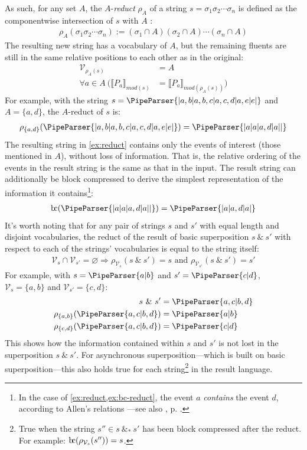 \documentclass[a4paper,12pt,leqno]{article}
\newcommand{\bc}{{\rm b\!c}}
\newcommand{\vph}[1]{\vphantom{#1}}
\newcommand{\ebox}[1]{\fbox{$\vph{'(),}#1$}}
\renewcommand{\sp}{~\&~}
\newcommand{\spasync}{~\&_*~}
\newcommand{\V}{\mathcal{V}}
\renewcommand{\emptyset}{\varnothing}
\newcommand{\EventString}[1]{%
	\renewcommand*{\do}[1]{\ebox{##1}}%
	\PipeParser{#1}%
}
\begin{document}
As such, for any set $A$, the $A$-\textit{reduct} $\rho_A$ of a string $s=\sigma_1\sigma_2\cdots\sigma_n$ is defined as the componentwise intersection of $s$ with $A$ \citep{fernando2016regular,woods2018improving}:
\begin{align}
	\rho_A(\sigma_1\sigma_2\cdots\sigma_n) := (\sigma_1 \cap A)(\sigma_2 \cap A)\cdots(\sigma_n \cap A)
\end{align}
The resulting new string has a vocabulary of $A$, but the remaining fluents are still in the same relative positions to each other as in the original:
\begin{align}
	\V_{\rho_A(s)} &= A\\
	\forall a \in A~ (\llbracket P_a \rrbracket_{mod(s)} &= \llbracket P_a \rrbracket_{mod(\rho_A(s))})
\end{align}
For example, with the string $s = \EventString{{}|a,b|a,b,c|a,c,d|a,e|e|{}}$ and $A=\{a,d\}$, the $A$-reduct of $s$ is:
\begin{align}\label{ex:reduct}
	\rho_{\{a,d\}}(\EventString{{}|a,b|a,b,c|a,c,d|a,e|e|{}}) = \EventString{{}|a|a|a,d|a|{}|{}}
\end{align}
The resulting string in \cref{ex:reduct} contains only the events of interest (those mentioned in $A$), without loss of information. That is, the relative ordering of the events in the result string is the same as that in the input. The result string can additionally be block compressed to derive the simplest representation of the information it contains\footnote{In the case of \cref{ex:reduct,ex:bc-reduct}, the event $a$ \textit{contains} the event $d$, according to Allen's relations \citep{allen1983maintaining}---see also , p. \pageref{fig:allens-pictorial}.}:
\begin{align}\label{ex:bc-reduct}
	\bc(\EventString{{}|a|a|a,d|a|{}|{}}) = \EventString{{}|a|a,d|a|{}}
\end{align}
It's worth noting that for any pair of strings $s$ and $s'$ with equal length and disjoint vocabularies, the reduct of the result of basic superposition $s \sp s'$ with respect to each of the strings' vocabularies is equal to the string itself:
\begin{align}\label{impl:disjoint-vocab-reduct}
	\V_{s} \cap \V_{s'} = \emptyset \Longrightarrow \rho_{\V_{s}}(s \sp s') = s \text{ and } \rho_{\V_{s'}}(s \sp s') = s'
\end{align}
For example, with $s = \EventString{a|b}$ and $s' = \EventString{c|d}$, $\V_s = \{a,b\}$ and $\V_{s'} = \{c,d\}$:
\begin{align}\label{ex:disjoint-vocab-reduct}
	s \sp s' &= \EventString{a,c|b,d}\\
	\rho_{\{a,b\}}(\EventString{a,c|b,d}) &= \EventString{a|b}\notag\\
	\rho_{\{c,d\}}(\EventString{a,c|b,d}) &= \EventString{c|d}\notag
\end{align}
This shows how the information contained within $s$ and $s'$ is not lost in the superposition $s \sp s'$. For asynchronous superposition---which is built on basic superposition---this also holds true for each string\footnote{True when the string $s'' \in s \spasync s'$ has been block compressed after the reduct. For example: $\bc(\rho_{\V_s}(s'')) = s$.} in the result language.
\end{document}
